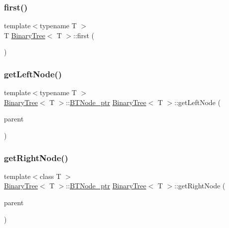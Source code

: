 \mbox{\label{class_binary_tree_ab428c078bc0d60bc99ebd6eebfb5bd89}} 
\subsubsection{\texorpdfstring{first()}{first()}}
{\footnotesize\ttfamily template$<$typename T $>$ \\
T \hyperlink{class_binary_tree}{Binary\+Tree}$<$ T $>$\+::first (\begin{DoxyParamCaption}\item[{void}]{ }\end{DoxyParamCaption})}

\mbox{\label{class_binary_tree_a0cbb93d97da33b5b8e5d3d1cc39b273c}} 
\subsubsection{\texorpdfstring{get\+Left\+Node()}{getLeftNode()}}
{\footnotesize\ttfamily template$<$typename T $>$ \\
\hyperlink{class_binary_tree}{Binary\+Tree}$<$ T $>$\+::\hyperlink{class_binary_tree_a35ef67d8ee2843144c5c309c5a6ecd5b}{B\+T\+Node\+\_\+ptr} \hyperlink{class_binary_tree}{Binary\+Tree}$<$ T $>$\+::get\+Left\+Node (\begin{DoxyParamCaption}\item[{\hyperlink{class_binary_tree_a35ef67d8ee2843144c5c309c5a6ecd5b}{B\+T\+Node\+\_\+ptr}}]{parent }\end{DoxyParamCaption})\hspace{0.3cm}{\ttfamily [protected]}}

\mbox{\label{class_binary_tree_a4d7abf750994e1fa5c414339aff21d4b}} 
\subsubsection{\texorpdfstring{get\+Right\+Node()}{getRightNode()}}
{\footnotesize\ttfamily template$<$class T $>$ \\
\hyperlink{class_binary_tree}{Binary\+Tree}$<$ T $>$\+::\hyperlink{class_binary_tree_a35ef67d8ee2843144c5c309c5a6ecd5b}{B\+T\+Node\+\_\+ptr} \hyperlink{class_binary_tree}{Binary\+Tree}$<$ T $>$\+::get\+Right\+Node (\begin{DoxyParamCaption}\item[{\hyperlink{class_binary_tree_a35ef67d8ee2843144c5c309c5a6ecd5b}{B\+T\+Node\+\_\+ptr}}]{parent }\end{DoxyParamCaption})\hspace{0.3cm}{\ttfamily [protected]}}

